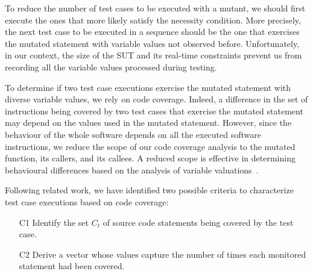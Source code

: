 

To reduce the number of test cases to be executed with a mutant, 
we should first execute the ones that more likely satisfy the necessity condition. 
More precisely, the next test case to be executed in a sequence should be the one that exercises the mutated statement with variable values not observed before. 
Unfortunately, in our context, the size of the SUT and its real-time constraints prevent us from recording all the variable values processed during testing. 

To determine if two test case executions exercise the mutated statement with diverse variable values, we rely on code coverage.
Indeed, a difference in the set of instructions being covered by two test cases that exercise the mutated statement may depend on the values used in the mutated statement. 
However, since the behaviour of the whole software depends on all the executed software instructions, we reduce the scope of our code coverage analysis 
to the mutated function, its callers, and its callees.
A reduced scope is effective in determining behavioural differences based on the analysis of variable valuations~\cite{Pastore:VART:2014}.

Following related work, we have identified two possible criteria to characterize test case executions based on code coverage:
\begin{itemize}
\item[C1] Identify the set $C_t$ of source code statements being covered by the test case.
\item[C2] Derive a vector whose values capture the number of times each monitored statement had been covered.
\end{itemize}

